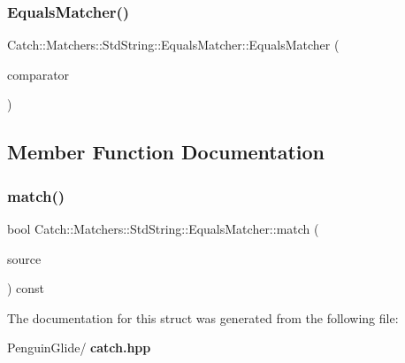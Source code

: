 \subsubsection{EqualsMatcher()}
{\footnotesize\ttfamily Catch\+::\+Matchers\+::\+Std\+String\+::\+Equals\+Matcher\+::\+Equals\+Matcher (\begin{DoxyParamCaption}\item[{\textbf{ Cased\+String} const \&}]{comparator }\end{DoxyParamCaption})}



\subsection{Member Function Documentation}
\mbox{\label{struct_catch_1_1_matchers_1_1_std_string_1_1_equals_matcher_a0bb9d64693f7bb1ef7441062d219f21a}} 
\subsubsection{match()}
{\footnotesize\ttfamily bool Catch\+::\+Matchers\+::\+Std\+String\+::\+Equals\+Matcher\+::match (\begin{DoxyParamCaption}\item[{std\+::string const \&}]{source }\end{DoxyParamCaption}) const\hspace{0.3cm}{\ttfamily [override]}}



The documentation for this struct was generated from the following file\+:\begin{DoxyCompactItemize}
\item 
Penguin\+Glide/\textbf{ catch.\+hpp}\end{DoxyCompactItemize}

